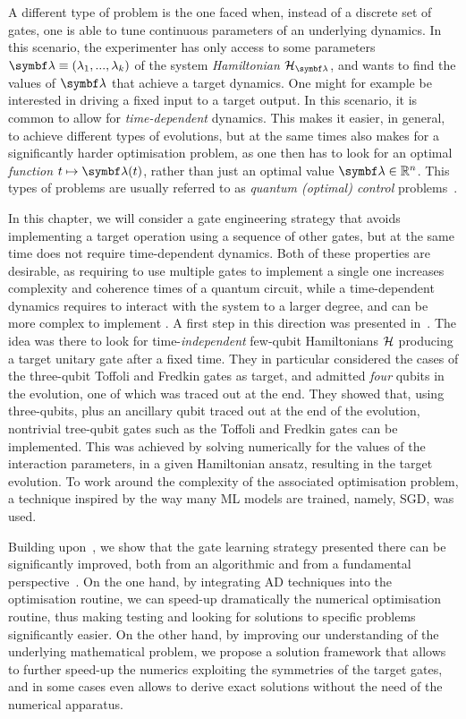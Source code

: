 A different type of problem is the one faced when, instead of a discrete set of gates, one is able to tune continuous parameters of an underlying dynamics.
In this scenario, the experimenter has only access to some parameters $\bs\lambda\equiv(\lambda_1,...,\lambda_k)$ of the system \textit{Hamiltonian} $\calH_{\bs\lambda}$, and wants to find the values of $\bs\lambda$ that achieve a target dynamics.
One might for example be interested in driving a fixed input to a target output.
In this scenario, it is common to allow for \textit{time-dependent} dynamics. This makes it easier, in general, to achieve different types of evolutions, but at the same times also makes for a significantly harder optimisation problem, as one then has to look for an optimal \textit{function} $t\mapsto\bs\lambda(t)$, rather than just an optimal value $\bs\lambda\in\mathbb R^n$.
This types of problems are usually referred to as \textit{quantum (optimal) control} problems~\cite{dalessandro2007introduction,dong2010quantum,werschnik2007quantum}.


In this chapter, we will consider a gate engineering strategy that avoids implementing a target operation using a sequence of other gates, but at the same time does not require time-dependent dynamics. Both of these properties are desirable, as requiring to use multiple gates to implement a single one increases complexity and coherence times of a quantum circuit, while a time-dependent dynamics requires to interact with the system to a larger degree, and can be more complex to implement .
A first step in this direction was presented in~\cite{banchi2016quantum}.
The idea was there to look for time-\emph{independent} few-qubit Hamiltonians ${\mathcal{H}}$ producing a target unitary gate after a fixed time. They in particular considered the cases of the three-qubit Toffoli and Fredkin gates as target, and admitted \emph{four} qubits in the evolution, one of which was traced out at the end.
They showed that, using three-qubits, plus an ancillary qubit traced out at the end of the evolution, nontrivial tree-qubit gates such as the Toffoli and Fredkin gates can be implemented.
This was achieved by solving numerically for the values of the interaction parameters, in a given Hamiltonian ansatz, resulting in the target evolution.
To work around the complexity of the associated optimisation problem, a technique inspired by the way many \ac{ML} models are trained, namely, \ac{SGD}, was used.


Building upon~\cite{banchi2016quantum}, we show that the gate learning strategy presented there can be significantly improved, both from an algorithmic and from a fundamental perspective~\cite{innocenti2018supervised}.
On the one hand, by integrating \ac{AD} techniques into the optimisation routine, we can speed-up dramatically the numerical optimisation routine, thus making testing and looking for solutions to specific problems significantly easier.
On the other hand, by improving our understanding of the underlying mathematical problem, we propose a solution framework that allows to further speed-up the numerics exploiting the symmetries of the target gates, and in some cases even allows to derive exact solutions without the need of the numerical apparatus.

